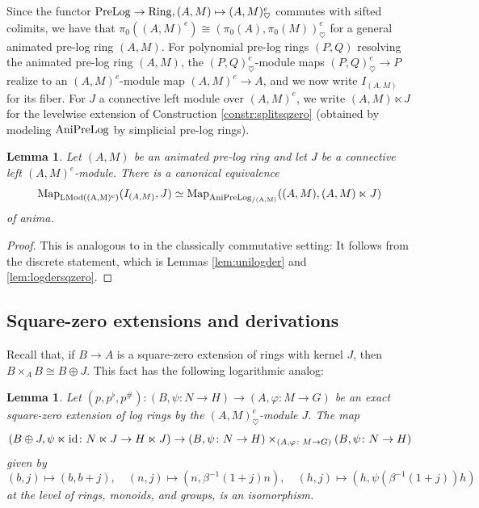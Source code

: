\documentclass[a4paper,10pt%
]{amsart}
\numberwithin{equation}{section}
\newtheorem{lemma}[subsection]{Lemma}
\theoremstyle{definition}
\renewcommand{\:}{\colon}
\begin{document}
Since the functor ${\rm PreLog} \to {\rm Ring}, (A, M) \mapsto (A, M)^e_{\heartsuit}$ commutes with sifted colimits, we have that $\pi_0((A, M)^e) \cong (\pi_0(A), \pi_0(M))^e_{\heartsuit}$ for a general animated pre-log ring $(A, M)$. For polynomial pre-log rings $(P, Q)$ resolving the animated pre-log ring $(A, M)$, the $(P, Q)^e_{\heartsuit}$-module maps $(P, Q)^e_{\heartsuit} \to P$ realize to an $(A, M)^e$-module map $(A, M)^e \to A$, and we now write $I_{(A, M)}$ for its fiber. For $J$ a connective left module over $(A, M)^e$, we write $(A, M) \ltimes J$ for the levelwise extension of Construction \ref{constr:splitsqzero} (obtained by modeling ${\rm AniPreLog}$ by simplicial pre-log rings). 

\begin{lemma}\label{lem:unilogderder} Let $(A, M)$ be an animated pre-log ring and let $J$ be a connective left $(A, M)^e$-module. There is a canonical equivalence \[{\rm Map}_{{\rm LMod((A, M)^e)}}(I_{(A, M)}, J) \simeq {\rm Map}_{{\rm AniPreLog_{/(A, M)}}}((A, M), (A, M) \ltimes J)\] of anima. 
\end{lemma}

\begin{proof} This is analogous to \cite[Lemma 4.6]{SSV16} in the classically commutative setting: It follows from the discrete statement, which is Lemmas \ref{lem:unilogder} and \ref{lem:logdersqzero}. 
\end{proof}

\subsection{Square-zero extensions and derivations} Recall that, if $B \to A$ is a square-zero extension of rings with kernel $J$, then $B \times_A B \cong B \oplus J$. This fact has the following logarithmic analog:

\begin{lemma}\label{lem:sqzeropull} Let $(p, p^\flat, p^\#) \colon (B, \psi \colon N \to H) \to (A, \varphi \colon M \to G)$ be an exact square-zero extension of log rings by the $(A, M)^e_{\heartsuit}$-module $J$. The map \[(B \oplus J, \psi \ltimes {\rm id} \colon N \ltimes J \to H \ltimes J) \to (B, \psi \colon N \to H) \times_{(A, \varphi \colon M \to G)} (B, \psi \colon N \to H)\] given by \[(b, j) \mapsto (b, b + j), \quad (n, j) \mapsto (n, \beta^{-1}(1 + j)n), \quad (h, j) \mapsto (h, \psi(\beta^{-1}(1 + j))h)\] at the level of rings, monoids, and groups, is an isomorphism. 
\end{lemma}
\end{document}
